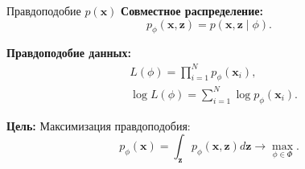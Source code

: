 \begin{frame}{Правдоподобие $p(\boldsymbol{x})$}
    \textbf{Совместное распределение:}
    \begin{equation*}
        p_{\phi}(\boldsymbol{x}, \boldsymbol{z}) = p(\boldsymbol{x}, \boldsymbol{z} \mid \phi).
    \end{equation*}

    \textbf{Правдоподобие данных:}
    \begin{align*}
         & L(\phi) = \prod_{i=1}^N p_{\phi}(\boldsymbol{x}_i),          \\
         & \log L(\phi) = \sum_{i=1}^N \log p_{\phi}(\boldsymbol{x}_i).
    \end{align*}

    \textbf{Цель:} Максимизация правдоподобия:
    \begin{equation*}
        p_{\phi}(\boldsymbol{x}) = \int_{\boldsymbol{z}} p_{\phi}(\boldsymbol{x}, \boldsymbol{z}) d\boldsymbol{z} \to \max_{\phi \in \Phi}.
    \end{equation*}
\end{frame}

